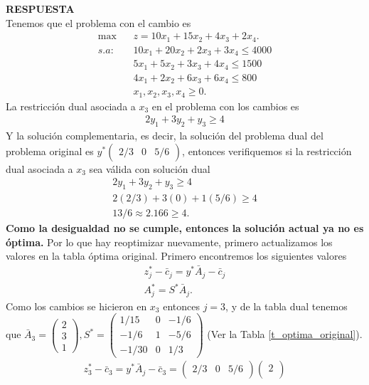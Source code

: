 \documentclass[11pt,letterpaper]{article}
\newcommand{\res}{\textbf{RESPUESTA}\\}
\begin{document}
\begin{enumerate}
\res Tenemos que el problema con el cambio es 
\begin{align*}
\max\ \ \ \ & z=10x_1+15x_2+4x_3+2x_4.\\
s.a:\ \ \ \ & 10x_1+20x_2 +2x_3+3x_4\leq 4000\\
	 & 5x_1+5x_2+3x_3+4x_4\leq 1500\\
	 & 4x_1+2x_2+6x_3+6x_4 \leq 800\\
	 & x_1,x_2,x_3,x_4 \geq 0. 
\end{align*}
La restricción dual asociada a $x_3$ en el problema con los cambios es
\begin{align*}
2y_1+3y_2+y_3\geq 4
\end{align*}
Y la solución complementaria, es decir, la solución del problema dual del problema original es $y^*\begin{pmatrix}
2/3 & 0 & 5/6
\end{pmatrix}$, entonces verifiquemos si la restricción dual asociada a $x_3$ sea válida con solución dual
\begin{align*}
2y_1+3y_2+y_3\geq 4\\
2(2/3)+3(0)+1(5/6)\geq 4\\
13/6\approx2.166\geq 4.
\end{align*}
\textbf{Como la desigualdad no se cumple, entonces la solución actual ya no es óptima.} Por lo que hay reoptimizar nuevamente, primero actualizamos los valores en la tabla óptima original. Primero encontremos los siguientes valores
\begin{align*}
z_j^* -\bar{c}_j=y^*\bar{A}_j-\bar{c}_j\\
A^*_j=S^*\bar{A}_j.
\end{align*}
Como los cambios se hicieron en $x_3$ entonces $j=3$, y de la tabla dual tenemos que $\bar{A}_3=\begin{pmatrix}
2\\
3\\
1
\end{pmatrix}, S^*=\begin{pmatrix}
1/15 & 0 & -1/6\\
-1/6 & 1 & -5/6\\
-1/30 & 0 & 1/3
\end{pmatrix} $ (Ver la Tabla \ref{t_optima_original}). 
\begin{align*}
z_3^* -\bar{c}_3=y^*\bar{A}_j-\bar{c}_3=\begin{pmatrix}
2/3 & 0 & 5/6
\end{pmatrix}\begin{pmatrix}
2\\

\end{pmatrix}
\end{align*}
\end{enumerate}
\end{document}
